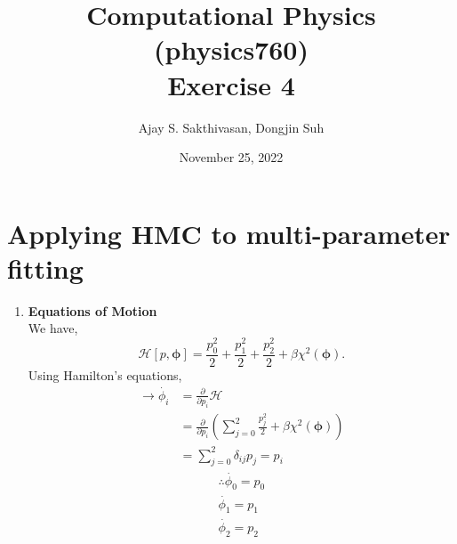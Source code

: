 \documentclass{article}
\title{Computational Physics (physics760)\\Exercise 4}
\author{Ajay S. Sakthivasan, Dongjin Suh}
\date{November 25, 2022}
\begin{document}
\maketitle

\section{Applying HMC to multi-parameter fitting}

\begin{enumerate}
\item \textbf{Equations of Motion}\\
We have, 
\begin{equation}
    \mathcal{H}[p, \bm{\phi}] = \frac{p_0^2}{2} + \frac{p_1^2}{2} + \frac{p_2^2}{2} + \beta\chi^2(\bm{\phi}).
\end{equation}
Using Hamilton's equations,
\begin{align*}
    \rightarrow \dot{\phi_i} &= \frac{\partial}{\partial p_i}\mathcal{H}\\
    &= \frac{\partial}{\partial p_i} \left(\sum_{j=0}^2\frac{p_j^2}{2} + \beta\chi^2(\bm{\phi})\right)\\
    &= \sum_{j=0}^2 \delta_{ij} p_j = p_i
\end{align*}
\begin{equation}
\begin{split}
    \therefore \boxed{\dot{\phi_0} = p_0}\\
    \boxed{\dot{\phi_1} = p_1}\\
    \boxed{\dot{\phi_2} = p_2}
\end{split}
\end{equation}


\end{enumerate}
\end{document}
